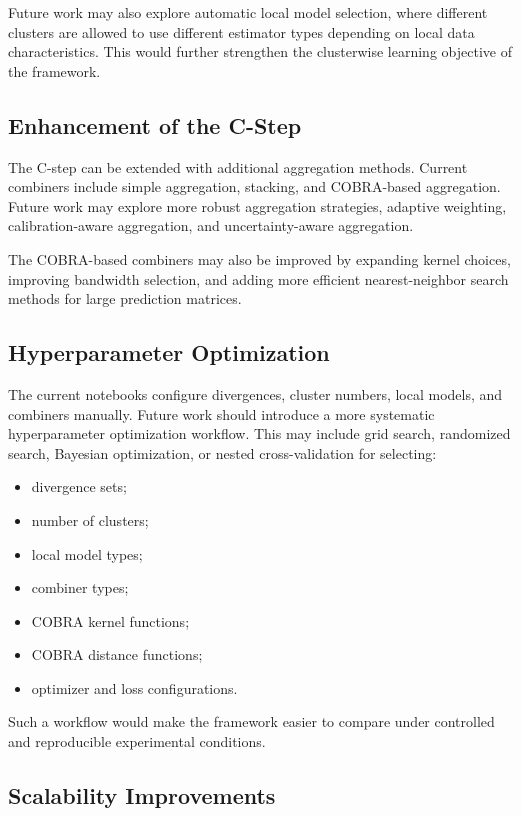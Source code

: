 Future work may also explore automatic local model selection, where different clusters are allowed to use different estimator types depending on local data characteristics. This would further strengthen the clusterwise learning objective of the framework.

\subsection{Enhancement of the C-Step}

The C-step can be extended with additional aggregation methods. Current combiners include simple aggregation, stacking, and COBRA-based aggregation. Future work may explore more robust aggregation strategies, adaptive weighting, calibration-aware aggregation, and uncertainty-aware aggregation.

The COBRA-based combiners may also be improved by expanding kernel choices, improving bandwidth selection, and adding more efficient nearest-neighbor search methods for large prediction matrices.

\subsection{Hyperparameter Optimization}

The current notebooks configure divergences, cluster numbers, local models, and combiners manually. Future work should introduce a more systematic hyperparameter optimization workflow. This may include grid search, randomized search, Bayesian optimization, or nested cross-validation for selecting:

\begin{itemize}
\item divergence sets;
\item number of clusters;
\item local model types;
\item combiner types;
\item COBRA kernel functions;
\item COBRA distance functions;
\item optimizer and loss configurations.
\end{itemize}

Such a workflow would make the framework easier to compare under controlled and reproducible experimental conditions.

\subsection{Scalability Improvements}

